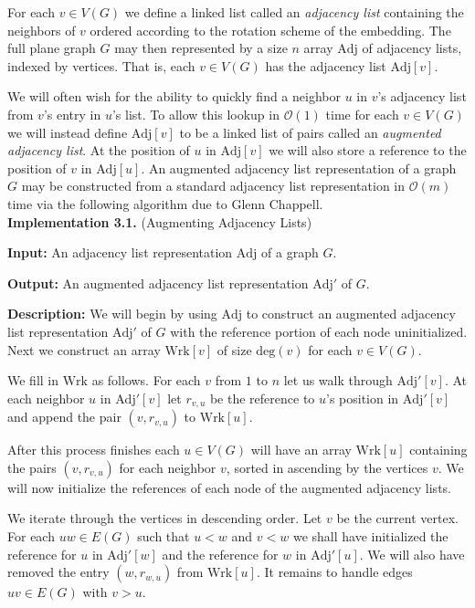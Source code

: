 \documentclass[letterpaper, 12pt]{amsart}
\theoremstyle{definition}
\theoremstyle{definition}
\theoremstyle{thm}
\theoremstyle{definition}
\begin{document}
For each $v\in V(G)$ we define a linked list called an
\emph{adjacency list} containing the neighbors of $v$ ordered according to
the rotation scheme of the embedding. The full plane graph $G$ may then
represented by a size $n$ array $\text{Adj}$ of adjacency lists, indexed by vertices.
That is, each $v\in V(G)$ has the adjacency list $\text{Adj}[v]$.

We will often wish for the ability to quickly find a neighbor $u$
in $v$'s adjacency list from $v$'s entry in $u$'s list. To allow this lookup in
$\mathcal{O}(1)$ time for each $v\in V(G)$ we will instead define $\text{Adj}[v]$
to be a linked list of pairs called an \textit{augmented adjacency list}.
At the position of $u$ in $\text{Adj}[v]$ we will also store a reference to
the position of $v$ in $\text{Adj}[u]$. An augmented adjacency list
representation of a graph $G$ may be constructed from a standard adjacency list
representation in $\mathcal{O}(m)$ time via the following algorithm due to 
Glenn Chappell.\\

\noindent\textbf{Implementation 3.1.} (Augmenting Adjacency Lists)

\noindent\textbf{Input:} An adjacency list representation $\text{Adj}$ of a
graph $G$.

\noindent\textbf{Output:} An augmented adjacency list representation
$\text{Adj}'$ of $G$.

\noindent\textbf{Description:} We will begin by using $\text{Adj}$ to construct
an augmented adjacency list representation $\text{Adj}'$ of $G$ with the
reference portion of each node uninitialized.
Next we construct an array $\text{Wrk}[v]$ of size $\text{deg}(v)$ for each
$v\in V(G)$.

We fill in $\text{Wrk}$ as follows. For each $v$ from $1$ to $n$ let us walk
through $\text{Adj}'[v]$. At each neighbor $u$ in $\text{Adj}'[v]$ let
$r_{v,u}$ be the reference to $u$'s position in $\text{Adj}'[v]$ and append the
pair $(v,r_{v,u})$ to $\text{Wrk}[u]$.

After this process finishes each $u\in V(G)$ will have an array $\text{Wrk}[u]$
containing the pairs $(v,r_{v,u})$ for each neighbor $v$, sorted in ascending by
the vertices $v$. We will now initialize the references of each node of the
augmented adjacency lists.

We iterate through the vertices in descending order. Let $v$ be the current
vertex. For each 
$uw\in E(G)$ such that $u<w$ and $v<w$ we shall have initialized the reference
for $u$ in $\text{Adj}'[w]$ and the reference for $w$ in $\text{Adj}'[u]$. We
will also have removed the entry $(w,r_{w,u})$ from $\text{Wrk}[u]$. It remains
to handle edges $uv\in E(G)$ with $v>u$.
\end{document}

